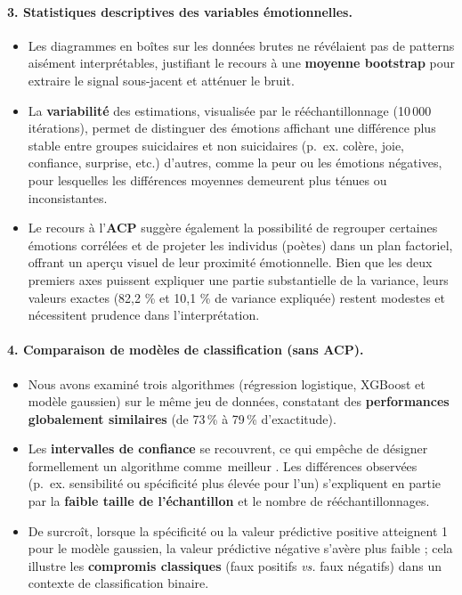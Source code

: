 \paragraph{3. Statistiques descriptives des variables émotionnelles.}
\begin{itemize}
	\item Les diagrammes en boîtes sur les données brutes ne révélaient pas de patterns aisément interprétables, justifiant le recours à une \textbf{moyenne bootstrap} pour extraire le signal sous-jacent et atténuer le bruit.  
	\item La \textbf{variabilité} des estimations, visualisée par le rééchantillonnage (10\,000 itérations), permet de distinguer des émotions affichant une différence plus stable entre groupes suicidaires et non suicidaires (p.~ex. colère, joie, confiance, surprise, etc.) d’autres, comme la peur ou les émotions négatives, pour lesquelles les différences moyennes demeurent plus ténues ou inconsistantes.  
	\item Le recours à l’\textbf{ACP} suggère également la possibilité de regrouper certaines émotions corrélées et de projeter les individus (poètes) dans un plan factoriel, offrant un aperçu visuel de leur proximité émotionnelle. Bien que les deux premiers axes puissent expliquer une partie substantielle de la variance, leurs valeurs exactes (82,2 \% et 10,1 \% de variance expliquée) restent modestes et nécessitent prudence dans l’interprétation.
\end{itemize}

\paragraph{4. Comparaison de modèles de classification (sans ACP).}
\begin{itemize}
	\item Nous avons examiné trois algorithmes (régression logistique, XGBoost et modèle gaussien) sur le même jeu de données, constatant des \textbf{performances globalement similaires} (de 73\,\% à 79\,\% d’exactitude).  
	\item Les \textbf{intervalles de confiance} se recouvrent, ce qui empêche de désigner formellement un algorithme comme \og\,meilleur \fg. Les différences observées (p.~ex. sensibilité ou spécificité plus élevée pour l’un) s’expliquent en partie par la \textbf{faible taille de l’échantillon} et le nombre de rééchantillonnages.  
	\item De surcroît, lorsque la spécificité ou la valeur prédictive positive atteignent 1 pour le modèle gaussien, la valeur prédictive négative s’avère plus faible ; cela illustre les \textbf{compromis classiques} (faux positifs \emph{vs.} faux négatifs) dans un contexte de classification binaire.
\end{itemize}

